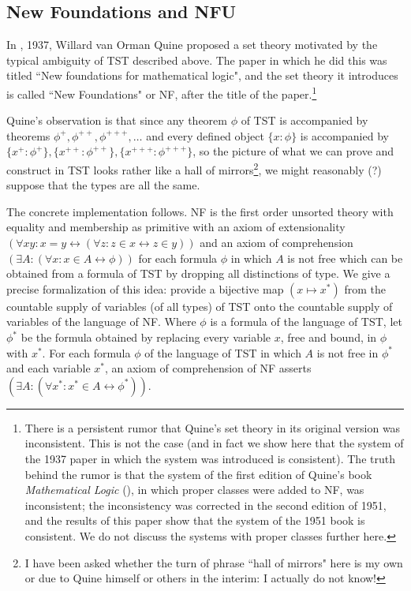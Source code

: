 \documentclass{article}
\theoremstyle{definition}
\theoremstyle{remark}
\begin{document}
\newpage

\subsection{New Foundations and NFU}

In \cite{nf}, 1937, Willard van Orman Quine proposed a set theory motivated by the typical ambiguity of TST described above.  The paper in which he did this was titled ``New foundations for mathematical logic", and the set theory it introduces is called ``New Foundations" or NF, after the title of the paper.\footnote{There is a persistent rumor that Quine's set theory in its original version was inconsistent.  This is not the case (and in fact we show here that the system of the 1937 paper in which the system was introduced is consistent).  The truth behind the rumor is that the system of the first edition of Quine's book {\em Mathematical Logic\/} (\cite{ml}), in which proper classes were added to NF, was inconsistent;  the inconsistency was corrected in the second edition of 1951, and the results of this paper show that the system of the 1951 book is consistent.  We do not discuss the systems with proper classes further here.}

Quine's observation is that since any theorem $\phi$ of TST is accompanied by theorems $\phi^+, \phi^{++}, \phi^{+++}, \ldots$ and every defined object $\{x:\phi\}$ is accompanied by
$\{x^+:\phi^+\},\{x^{++}:\phi^{++}\},\{x^{+++}:\phi^{+++}\}$, so the picture of what we can prove and construct in TST looks rather like a hall of mirrors\footnote{I have been asked whether the turn of phrase ``hall of mirrors" here is my own or due to Quine himself or others in the interim:  I actually do not know!}, we might reasonably (?) suppose that the types are all the same.

The concrete implementation follows.  NF is the first order unsorted theory with equality and membership as primitive with an axiom of extensionality $(\forall xy:x=y \leftrightarrow (\forall z:z \in x \leftrightarrow z\in y))$ and an axiom of comprehension $(\exists A:(\forall x:x \in A \leftrightarrow \phi))$ for each formula $\phi$ in which $A$ is not free which can be obtained from a formula of TST by dropping all distinctions of type.  We give a precise formalization of this idea:  provide a bijective map $(x \mapsto x^*)$ from the countable supply of variables (of all types) of TST onto the countable supply of variables of the language of NF.  Where $\phi$ is a formula of the language of TST, let $\phi^*$ be the formula obtained by replacing every variable $x$, free and bound,
in $\phi$ with $x^*$. For each formula $\phi$ of the language of TST in which $A$ is not free in $\phi^*$ and each variable $x^*$, an axiom of comprehension of NF asserts $(\exists A:(\forall x^*:x^* \in A \leftrightarrow \phi^*))$.
\end{document}
